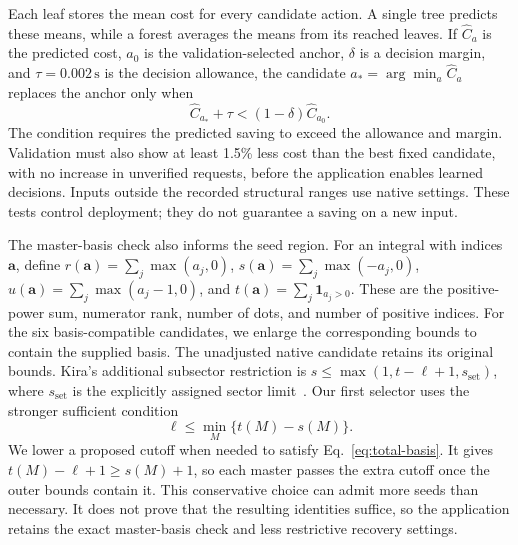 Each leaf stores the mean cost for every candidate action. A single tree predicts these means, while a forest averages the means from its reached leaves. If $\widehat C_a$ is the predicted cost, $a_0$ is the validation-selected anchor, $\delta$ is a decision margin, and $\tau=0.002\,\mathrm{s}$ is the decision allowance, the candidate $a_*=\arg\min_a\widehat C_a$ replaces the anchor only when
\begin{equation}
 \widehat C_{a_*}+\tau<(1-\delta)\widehat C_{a_0}.
 \label{eq:total-gate}
\end{equation}
The condition requires the predicted saving to exceed the allowance and margin. Validation must also show at least 1.5\% less cost than the best fixed candidate, with no increase in unverified requests, before the application enables learned decisions. Inputs outside the recorded structural ranges use native settings. These tests control deployment; they do not guarantee a saving on a new input.

The master-basis check also informs the seed region. For an integral with indices $\boldsymbol a$, define $r(\boldsymbol a)=\sum_j\max(a_j,0)$, $s(\boldsymbol a)=\sum_j\max(-a_j,0)$, $u(\boldsymbol a)=\sum_j\max(a_j-1,0)$, and $t(\boldsymbol a)=\sum_j\mathbf1_{a_j>0}$. These are the positive-power sum, numerator rank, number of dots, and number of positive indices. For the six basis-compatible candidates, we enlarge the corresponding bounds to contain the supplied basis. The unadjusted native candidate retains its original bounds. Kira's additional subsector restriction is $s\leq\max(1,t-\ell+1,s_{\mathrm{set}})$, where $s_{\mathrm{set}}$ is the explicitly assigned sector limit~\cite{Kira3}. Our first selector uses the stronger sufficient condition
\begin{equation}
 \ell\leq\min_{M}\{t(M)-s(M)\}.
 \label{eq:total-basis}
\end{equation}
We lower a proposed cutoff when needed to satisfy Eq.~\eqref{eq:total-basis}. It gives $t(M)-\ell+1\geq s(M)+1$, so each master passes the extra cutoff once the outer bounds contain it. This conservative choice can admit more seeds than necessary. It does not prove that the resulting identities suffice, so the application retains the exact master-basis check and less restrictive recovery settings.

